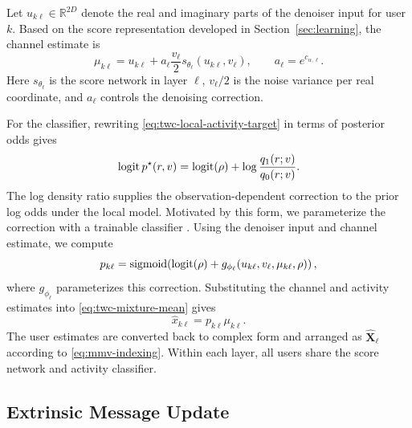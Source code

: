 Let $u_{k\ell}\in\mathbb R^{2D}$ denote the real and imaginary parts
of the denoiser input for user $k$. Based on the score representation developed
in Section~\ref{sec:learning}, the channel estimate is
\begin{equation}
 \mu_{k\ell}=u_{k\ell}
       +a_\ell\frac{v_\ell}{2}s_{\theta_\ell}(u_{k\ell},v_\ell),
 \qquad a_\ell=e^{c_{\alpha,\ell}}.
 \label{eq:twc-conditional-mean}
\end{equation}
Here $s_{\theta_\ell}$ is the score network in layer $\ell$,
$v_\ell/2$ is the noise variance per real coordinate, and $a_\ell$
controls the denoising correction.

For the classifier, rewriting \eqref{eq:twc-local-activity-target}
in terms of posterior odds gives
\begin{equation}
 \operatorname{logit} p^\star(r,v)
 =\operatorname{logit}(\rho)+\log\frac{q_1(r;v)}{q_0(r;v)}.
 \label{eq:twc-activity-odds}
\end{equation}
The log density ratio supplies the observation-dependent correction
to the prior log odds under the local model. Motivated by this form,
we parameterize the correction with a trainable classifier
\cite{menon2016}.
Using the denoiser input and channel estimate, we compute
\begin{equation}
 p_{k\ell}=\operatorname{sigmoid}\!\left(\operatorname{logit}(\rho)+
 g_{\phi_\ell}(u_{k\ell},v_\ell,\mu_{k\ell},\rho)\right),
 \label{eq:twc-activity}
\end{equation}
where $g_{\phi_\ell}$ parameterizes this correction. Substituting
the channel and activity estimates into
\eqref{eq:twc-mixture-mean} gives
\begin{equation}
 \widehat x_{k\ell}=p_{k\ell}\mu_{k\ell}.
 \label{eq:twc-estimate}
\end{equation}
The user estimates are converted back to complex form and arranged
as $\widehat{\mathbf X}_\ell$ according to \eqref{eq:mmv-indexing}.
Within each layer, all users share the score network and activity
classifier.

\subsection{Extrinsic Message Update}

